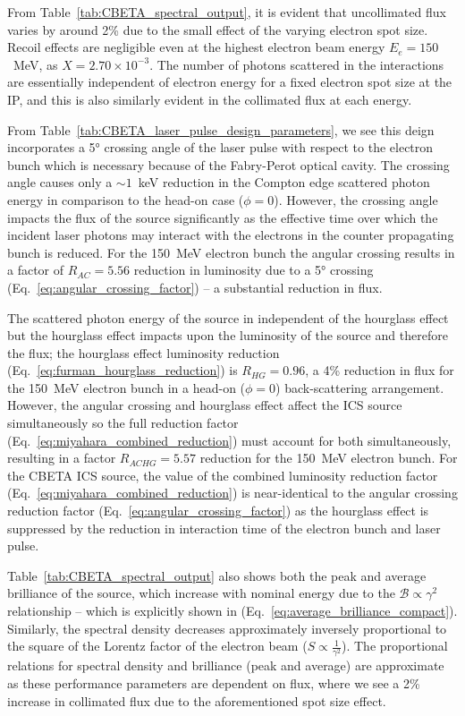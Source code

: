 \documentclass[../main.tex]{subfiles}
\begin{document}
From Table~\ref{tab:CBETA_spectral_output}, it is evident that uncollimated flux varies by around 2\% due to the small effect of the varying electron spot size. Recoil effects are negligible even at the highest electron beam energy $E_{e} = 150$~\si{\mega\electronvolt}, as $X = 2.70\times 10^{-3}$. The number of photons scattered in the interactions are essentially independent of electron energy for a fixed electron spot size at the IP, and this is also similarly evident in the collimated flux at each energy. 

From Table~\ref{tab:CBETA_laser_pulse_design_parameters}, we see this deign incorporates a 5\si{\degree} crossing angle of the laser pulse with respect to the electron bunch which is necessary because of the Fabry-Perot optical cavity. The crossing angle causes only a $\sim 1$~\si{\kilo\electronvolt} reduction in the Compton edge scattered photon energy in comparison to the head-on case ($\phi = 0$). However, the crossing angle impacts the flux of the source significantly as the effective time over which the incident laser photons may interact with the electrons in the counter propagating bunch is reduced. For the 150~\si{\mega\electronvolt} electron bunch the angular crossing results in a factor of $R_{AC} = 5.56$ reduction in luminosity due to a 5\si{\degree} crossing (Eq.~\ref{eq:angular_crossing_factor}) -- a substantial reduction in flux. 

The scattered photon energy of the source in independent of the hourglass effect but the hourglass effect impacts upon the luminosity of the source and therefore the flux; the hourglass effect luminosity reduction (Eq.~\ref{eq:furman_hourglass_reduction}) is $R_{HG} = 0.96$, a 4\% reduction in flux for the 150~\si{\mega\electronvolt} electron bunch in a head-on ($\phi=0$) back-scattering arrangement. However, the angular crossing and hourglass effect affect the ICS source simultaneously so the full reduction factor (Eq.~\ref{eq:miyahara_combined_reduction}) must account for both simultaneously, resulting in a factor $R_{ACHG} = 5.57$ reduction for the 150~\si{\mega\electronvolt} electron bunch. For the CBETA ICS source, the value of the combined luminosity reduction factor (Eq.~\ref{eq:miyahara_combined_reduction}) is  near-identical to the angular crossing reduction factor (Eq.~\ref{eq:angular_crossing_factor}) as the hourglass effect is suppressed by the reduction in interaction time of the electron bunch and laser pulse. 

Table~\ref{tab:CBETA_spectral_output} also shows both the peak and average brilliance of the source, which increase with nominal energy due to the $\mathcal{B} \propto \gamma^{2}$ relationship -- which is explicitly shown in (Eq.~\ref{eq:average_brilliance_compact}).  Similarly, the spectral density decreases approximately inversely proportional to the square of the Lorentz factor of the electron beam ($S \propto \frac{1}{\gamma^{2}}$). The proportional relations for spectral density and brilliance (peak and average) are approximate as these performance parameters are dependent on flux, where we see a 2\% increase in collimated flux due to the aforementioned spot size effect. 
\end{document}

